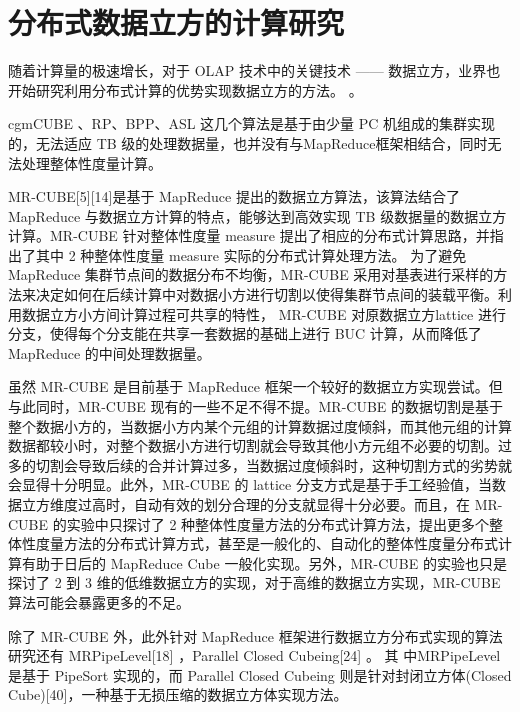 \section{分布式数据立方的计算研究}

随着计算量的极速增长，对于 OLAP 技术中的关键技术 —— 数据立方，业界也开始研究利用分布式计算的优势实现数据立方的方法。\cite{nandi2011distributed} \cite{dehne2006cgmcube} \cite{ng2011iceberg} \cite{lee2012efficient}。

cgmCUBE \cite{dehne2006cgmcube}、RP、BPP、ASL \cite{lee2012efficient} 这几个算法是基于由少量 PC 机组成的集群实现的，无法适应 TB 级的处理数据量，也并没有与MapReduce框架相结合，同时无法处理整体性度量计算。

MR-CUBE[5][14]是基于 MapReduce 提出的数据立方算法，该算法结合了MapReduce 与数据立方计算的特点，能够达到高效实现 TB 级数据量的数据立方计算。MR-CUBE 针对整体性度量 measure 提出了相应的分布式计算思路，并指出了其中 2 种整体性度量 measure 实际的分布式计算处理方法。 为了避免MapReduce 集群节点间的数据分布不均衡，MR-CUBE 采用对基表进行采样的方法来决定如何在后续计算中对数据小方进行切割以使得集群节点间的装载平衡。利用数据立方小方间计算过程可共享的特性， MR-CUBE 对原数据立方lattice 进行分支，使得每个分支能在共享一套数据的基础上进行 BUC 计算，从而降低了 MapReduce 的中间处理数据量。

虽然 MR-CUBE 是目前基于 MapReduce 框架一个较好的数据立方实现尝试。但与此同时，MR-CUBE 现有的一些不足不得不提。MR-CUBE 的数据切割是基于整个数据小方的，当数据小方内某个元组的计算数据过度倾斜，而其他元组的计算数据都较小时，对整个数据小方进行切割就会导致其他小方元组不必要的切割。过多的切割会导致后续的合并计算过多，当数据过度倾斜时，这种切割方式的劣势就会显得十分明显。此外，MR-CUBE 的 lattice 分支方式是基于手工经验值，当数据立方维度过高时，自动有效的划分合理的分支就显得十分必要。而且，在 MR-CUBE 的实验中只探讨了 2 种整体性度量方法的分布式计算方法，提出更多个整体性度量方法的分布式计算方式，甚至是一般化的、自动化的整体性度量分布式计算有助于日后的 MapReduce Cube 一般化实现。另外，MR-CUBE 的实验也只是探讨了 2 到 3 维的低维数据立方的实现，对于高维的数据立方实现，MR-CUBE 算法可能会暴露更多的不足。

除了 MR-CUBE 外，此外针对 MapReduce 框架进行数据立方分布式实现的算法研究还有 MRPipeLevel[18] ，Parallel Closed Cubeing[24] 。 其 中MRPipeLevel 是基于 PipeSort 实现的，而 Parallel Closed Cubeing 则是针对封闭立方体(Closed Cube)[40]，一种基于无损压缩的数据立方体实现方法。
